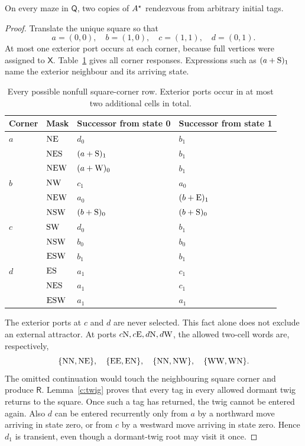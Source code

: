 \begin{lemma}\label{c:square}
On every maze in \(\mathsf Q\), two copies of \(A^{\star}\) rendezvous from
arbitrary initial tags.
\end{lemma}
\begin{proof}
Translate the unique square so that
\[
a=(0,0),\quad b=(1,0),\quad c=(1,1),\quad d=(0,1).
\]
At most one exterior port occurs at each corner, because full vertices were
assigned to \(\mathsf X\). Table~\ref{c:square-table} gives all corner
responses. Expressions such as \((a+\mathrm{S})_1\) name the exterior
neighbour and its arriving state.

\begin{table}[!htbp]
\centering\small
\begin{tabular}{llll}
\toprule
Corner & Mask & Successor from state 0 & Successor from state 1 \\
\midrule
\(a\) & \(\mathrm{N}\mathrm{E}\) & \(d_0\) & \(b_1\) \\
 & \(\mathrm{N}\mathrm{E}\mathrm{S}\) & \((a+\mathrm{S})_1\) & \(b_1\) \\
 & \(\mathrm{N}\mathrm{E}\mathrm{W}\) & \((a+\mathrm{W})_0\) & \(b_1\) \\
\addlinespace
\(b\) & \(\mathrm{N}\mathrm{W}\) & \(c_1\) & \(a_0\) \\
 & \(\mathrm{N}\mathrm{E}\mathrm{W}\) & \(a_0\) & \((b+\mathrm{E})_1\) \\
 & \(\mathrm{N}\mathrm{S}\mathrm{W}\) & \((b+\mathrm{S})_0\) & \((b+\mathrm{S})_0\) \\
\addlinespace
\(c\) & \(\mathrm{S}\mathrm{W}\) & \(d_0\) & \(b_1\) \\
 & \(\mathrm{N}\mathrm{S}\mathrm{W}\) & \(b_0\) & \(b_0\) \\
 & \(\mathrm{E}\mathrm{S}\mathrm{W}\) & \(b_1\) & \(b_1\) \\
\addlinespace
\(d\) & \(\mathrm{E}\mathrm{S}\) & \(a_1\) & \(c_1\) \\
 & \(\mathrm{N}\mathrm{E}\mathrm{S}\) & \(a_1\) & \(c_1\) \\
 & \(\mathrm{E}\mathrm{S}\mathrm{W}\) & \(a_1\) & \(a_1\) \\
\bottomrule
\end{tabular}
\caption{Every possible nonfull square-corner row. Exterior ports occur in
at most two additional cells in total.}
\label{c:square-table}
\end{table}

The exterior ports at \(c\) and \(d\) are never selected. This fact alone
does not exclude an external attractor. At ports \(c\mathrm{N},c\mathrm{E},d\mathrm{N},d\mathrm{W}\),
the allowed two-cell words are, respectively,
\[
\{\mathrm{N}\mathrm{N},\mathrm{N}\mathrm{E}\},\quad \{\mathrm{E}\mathrm{E},\mathrm{E}\mathrm{N}\},\quad
\{\mathrm{N}\mathrm{N},\mathrm{N}\mathrm{W}\},\quad \{\mathrm{W}\mathrm{W},\mathrm{W}\mathrm{N}\}.
\]
The omitted continuation would touch the neighbouring square corner and
produce \(\mathsf R\). Lemma~\ref{c:twig} proves that every tag in every
allowed dormant twig returns to the square. Once such a tag has returned,
the twig cannot be entered again. Also \(d\) can be entered recurrently
only from \(a\) by a northward move arriving in state zero, or from
\(c\) by a westward move arriving in state zero. Hence \(d_1\) is
transient, even though a dormant-twig root may visit it once.


\end{proof}
